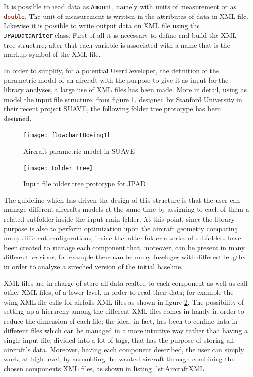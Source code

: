 \bigskip
\noindent
It is possible to read data as \lstinline[language=Java]!Amount!\cite{jscienceAmount}, namely with units of measurement or as \lstinline[language=Java]!double!. The unit of measurement is written in the attributes of data in XML file.
%
Likewise it is possible to write output data on XML file using the \lstinline[language=Java]!JPADDataWriter! class. First of all it is necessary to define and build the XML tree structure; after that each variable is associated with a name that is the markup symbol of the XML file.

\bigskip
\noindent
In order to simplify, for a potential \gls{User:Developer}, the definition of the parametric model of an aircraft with the purpose to give it as input for the library analyses, a large use of XML files has been made. More in detail, using as model the input file structure, from figure \ref{fig:SUAVE1}, designed by Stanford University in their recent project SUAVE\cite{SUAVE}, the following folder tree prototype has been designed.
%
\begin{figure}[!t]
\centering
\texttt{[image: flowchartBoeing1]}
\caption{Aircraft parametric model in SUAVE}
\label{fig:SUAVE1}
\end{figure}
%
\begin{figure}[!b]
\centering
\texttt{[image: Folder\_Tree]}
\caption{Input file folder tree prototype for \gls{JPAD}}
\label{fig:inputJPAD}
\end{figure}

\bigskip
\noindent
The guideline which has driven the design of this structure is that the user can manage different aircrafts models at the same time by assigning to each of them a related subfolder inside the input main folder. At this point, since the library purpose is also to perform optimization upon the aircraft geometry comparing many different configurations, inside the latter folder a series of subfolders have been created to manage each component that, moreover, can be present in many different versions; for example there can be many fuselages with different lengths in order to analyze a streched version of the initial baseline. 

\bigskip
\noindent
XML files are in charge of store all data realted to each component as well as call other XML files, of a lower level, in order to read their data; for example the wing XML file calls for airfoils XML files as shown in figure \ref{fig:inputJPAD}. The possibility of setting up a hierarchy among the different XML files comes in handy in order to reduce the dimension of each file; the idea, in fact, has been to confine data in different files which can be managed in a more intuitive way rather than having a single input file, divided into a lot of tags, that has the purpose of storing all aircraft's data. Moreover, having each component described, the user can simply work, at high level, by assembling the wanted aircraft through combining the chosen components XML files, as shown in listing \ref{lst:AircraftXML}.

